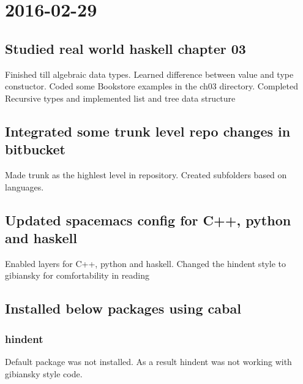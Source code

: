 \documentclass[11pt]{article}
\begin{document}
\section{2016-02-29}
\label{sec:orgheadline18}
\subsection{Studied real world haskell chapter 03}
\label{sec:orgheadline13}
Finished till algebraic data types. Learned difference between value and type constuctor.
Coded some Bookstore examples in the ch03 directory.
Completed Recursive types and implemented list and tree data structure
\subsection{Integrated some trunk level repo changes in bitbucket}
\label{sec:orgheadline14}
Made trunk as the highlest level in repository. Created subfolders based on languages.
\subsection{Updated spacemacs config for C++, python and haskell}
\label{sec:orgheadline15}
Enabled layers for C++, python and haskell. Changed the hindent style to gibiansky
for comfortability in reading
\subsection{Installed below packages using cabal}
\label{sec:orgheadline17}
\subsubsection{hindent}
\label{sec:orgheadline16}
Default package was not installed. As a result hindent was not working with gibiansky
style code.
\end{document}
